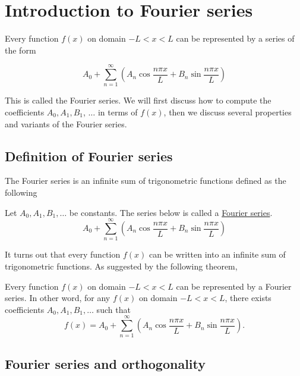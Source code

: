 \section{Introduction to Fourier series}

Every function $f(x)$ on domain $-L<x<L$ can be represented by a series of the form

\begin{equation*}
    A_0+\sum_{n=1}^{\infty}\left(A_n \cos \frac{n \pi x}{L}+B_n \sin \frac{n \pi x}{L}\right)
\end{equation*}

This is called the Fourier series. We will first discuss how to compute the coefficients $A_0, A_1, B_1$, $\dots$ in terms of $f(x)$, then we discuss several properties and variants of the Fourier series.

\subsection{Definition of Fourier series}

The Fourier series is an infinite sum of trigonometric functions defined as the following

\begin{definition} Let $A_0, A_1, B_1, \ldots$ be constants. The series below is called a \underline{Fourier series}.
    \begin{equation}\label{eq.fourier_def}
        A_0+\sum_{n=1}^{\infty}\left(A_n \cos \frac{n \pi x}{L}+B_n \sin \frac{n \pi x}{L}\right)
    \end{equation}
\end{definition}

It turns out that every function $f(x)$ can be written into an infinite sum of trigonometric functions. As suggested by the following theorem,

\begin{theorem}[]
Every function $f(x)$ on domain $-L<x<L$ can be represented by a Fourier series. In other word, for any $f(x)$ on domain $-L<x<L$, there exists coefficients $A_0, A_1, B_1, \dots$ such that 
\begin{equation}\label{eq.fourier}
    f(x)=A_0+\sum_{n=1}^{\infty}\left(A_n \cos \frac{n \pi x}{L}+B_n \sin \frac{n \pi x}{L}\right) .
\end{equation}
\end{theorem}


\subsection{Fourier series and orthogonality}

